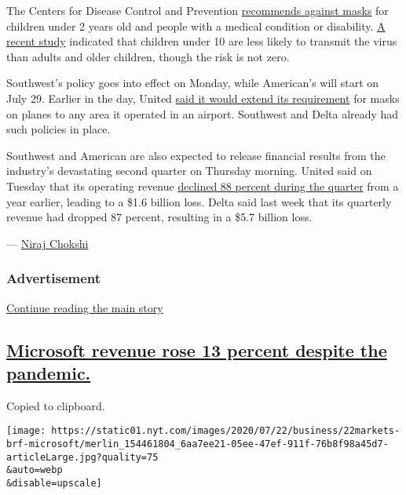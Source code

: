 The Centers for Disease Control and Prevention
\href{https://www.cdc.gov/coronavirus/2019-ncov/prevent-getting-sick/how-to-wear-cloth-face-coverings.html}{recommends
against masks} for children under 2 years old and people with a medical
condition or disability.
\href{https://www.nytimes.com/2020/07/18/health/coronavirus-children-schools.html}{A
recent study} indicated that children under 10 are less likely to
transmit the virus than adults and older children, though the risk is
not zero.

Southwest's policy goes into effect on Monday, while American's will
start on July 29. Earlier in the day, United
\href{https://www.nytimes.com/live/2020/07/22/business/stock-market-today-coronavirus/united-airlines-to-require-masks-in-airports-too}{said
it would extend its requirement} for masks on planes to any area it
operated in an airport. Southwest and Delta already had such policies in
place.

Southwest and American are also expected to release financial results
from the industry's devastating second quarter on Thursday morning.
United said on Tuesday that its operating revenue
\href{https://www.nytimes.com/live/2020/07/21/business/stock-market-today-coronavirus/united-earnings}{declined
88 percent during the quarter} from a year earlier, leading to a \$1.6
billion loss. Delta said last week that its quarterly revenue had
dropped 87 percent, resulting in a \$5.7 billion loss.

--- \href{https://www.nytimes.com/by/niraj-chokshi}{Niraj Chokshi}

\hypertarget{advertisement-1}{%
\subsubsection{Advertisement}\label{advertisement-1}}

\protect\hyperlink{after-dfp-ad-mid2}{Continue reading the main story}

\hypertarget{microsoft-revenue-rose-13-percent-despite-the-pandemic}{%
\subsection{\texorpdfstring{\protect\hyperlink{microsoft-earnings}{Microsoft
revenue rose 13 percent despite the
pandemic.}}{Microsoft revenue rose 13 percent despite the pandemic.}}\label{microsoft-revenue-rose-13-percent-despite-the-pandemic}}

Copied to clipboard.

\texttt{[image: https://static01.nyt.com/images/2020/07/22/business/22markets-brf-microsoft/merlin\_154461804\_6aa7ee21-05ee-47ef-911f-76b8f98a45d7-articleLarge.jpg?quality=75\\\&auto=webp\\\&disable=upscale]}

